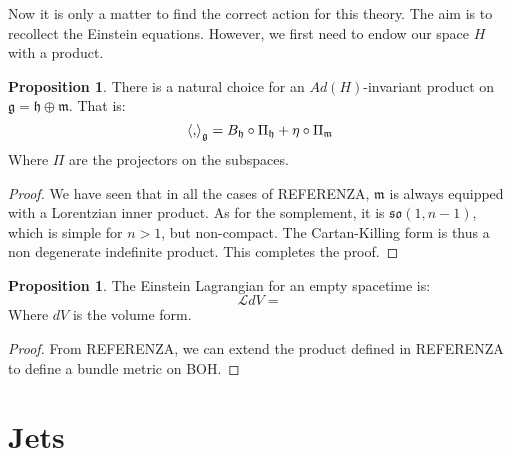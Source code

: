 \documentclass[12pt,a4paper]{report}
\theoremstyle{definition}
\theoremstyle{Theorem}
\newtheorem{Prop}[Def]{Proposition}
\theoremstyle{definition}
\theoremstyle{definition}
\begin{document}
	Now it is only a matter to find the correct action for this theory. The aim is to recollect the Einstein equations. However, we first need to endow our space $H$ with a product.
	\begin{Prop}
		There is a natural choice for an $Ad(H)$-invariant product on $\mathfrak{g}=\mathfrak{h}\oplus\mathfrak{m}$. That is:
		$$\braket{,}_\mathfrak{g}=B_\mathfrak{h}\circ\Pi_\mathfrak{h}+\eta\circ\Pi_\mathfrak{m}$$
		Where $\Pi$ are the projectors on the subspaces.
	\end{Prop}
	\begin{proof}
		We have seen that in all the cases of REFERENZA, $\mathfrak{m}$ is always equipped with a Lorentzian inner product. As for the somplement, it is $\mathfrak{so}(1,n-1)$, which is simple for $n>1$, but non-compact. The Cartan-Killing form is thus a non degenerate indefinite product. This completes the proof.
	\end{proof}
	\begin{Prop}
		The Einstein Lagrangian for an empty spacetime is:
		$$\mathcal{L}dV=$$
		Where $dV$ is the volume form.
	\end{Prop}
	\begin{proof}
		From REFERENZA, we can extend the product defined in REFERENZA to define a bundle metric on BOH.
	\end{proof}
	\chapter{Jets}
\end{document}
